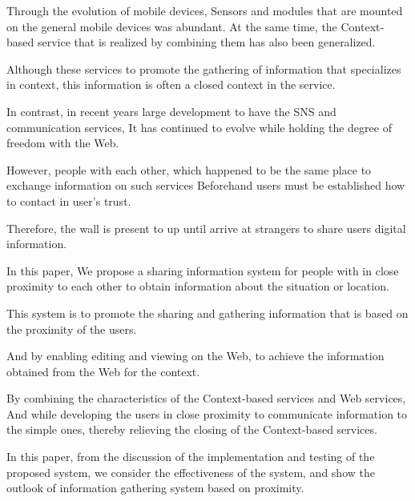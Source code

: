 \begin{eabstract}

Through the evolution of mobile devices,
Sensors and modules that are mounted on the general mobile devices was abundant.
At the same time, the Context-based service that is realized by combining them has also been generalized.

Although these services to promote the gathering of information that specializes in context,
this information is often a closed context in the service.

In contrast, in recent years large development to have the SNS and communication services,
It has continued to evolve while holding the degree of freedom with the Web.

However, people with each other, which happened to be the same place to exchange information on such services
Beforehand users must be established how to contact in user's trust.

Therefore, the wall is present to up until arrive at strangers to share users digital information.

In this paper,
We propose a sharing information system for people with in close proximity to each other to obtain information about the situation or location.

This system is to promote the sharing and gathering information
that is based on the proximity of the users.

And by enabling editing and viewing on the Web,
to achieve the information obtained from the Web for the context.

By combining the characteristics of the Context-based services and Web services,
And while developing the users in close proximity
to communicate information to the simple ones,
thereby relieving the closing of the Context-based services.

In this paper,
from the discussion of the implementation and testing of the proposed system,
we consider the effectiveness of the system,
and show the outlook of information gathering system based on proximity.

\end{eabstract}
